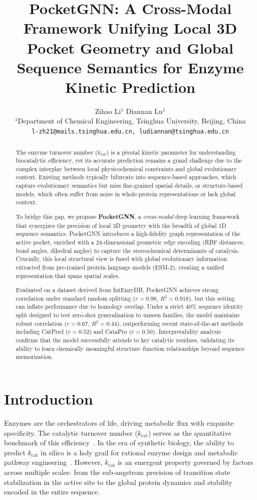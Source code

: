 \documentclass[11pt]{article}
\title{\textbf{PocketGNN: A Cross-Modal Framework Unifying Local 3D Pocket Geometry and Global Sequence Semantics for Enzyme Kinetic Prediction}}
\author{
  Zihao Li$^{1}$ \quad Diannan Lu$^{1}$\\[3pt]
  $^{1}$Department of Chemical Engineering, Tsinghua University, Beijing, China\\
  \texttt{l-zh21@mails.tsinghua.edu.cn, ludiannan@tsinghua.edu.cn}
}
\date{}
\begin{document}
\maketitle

\begin{abstract}
The enzyme turnover number ($k_{\text{cat}}$) is a pivotal kinetic parameter for understanding biocatalytic efficiency, yet its accurate prediction remains a grand challenge due to the complex interplay between local physicochemical constraints and global evolutionary context. Existing methods typically bifurcate into sequence-based approaches, which capture evolutionary semantics but miss fine-grained spatial details, or structure-based models, which often suffer from noise in whole-protein representations or lack global context.

To bridge this gap, we propose \textbf{PocketGNN}, a \emph{cross-modal} deep learning framework that synergizes the precision of local 3D geometry with the breadth of global 1D sequence semantics. PocketGNN introduces a high-fidelity graph representation of the active pocket, enriched with a 24-dimensional geometric edge encoding (RBF distances, bond angles, dihedral angles) to capture the stereochemical determinants of catalysis. Crucially, this local structural view is fused with global evolutionary information extracted from pre-trained protein language models (ESM-2), creating a unified representation that spans spatial scales.

Evaluated on a dataset derived from IntEnzyDB, PocketGNN achieves strong correlation under standard random splitting ($r=0.98$, $R^2=0.918$), but this setting can inflate performance due to homology overlap. Under a strict 40\% sequence identity split designed to test zero-shot generalization to unseen families, the model maintains robust correlation ($r=0.67$, $R^2=0.44$), outperforming recent state-of-the-art methods including CatPred ($r=0.52$) and CataPro ($r=0.50$). Interpretability analysis confirms that the model successfully attends to key catalytic residues, validating its ability to learn chemically meaningful structure--function relationships beyond sequence memorization.
\end{abstract}

\section{Introduction}
\label{sec:intro}

Enzymes are the orchestrators of life, driving metabolic flux with exquisite specificity. The catalytic turnover number ($k_{\text{cat}}$) serves as the quantitative benchmark of this efficiency~\citep{srinivasan2023guide}. In the era of synthetic biology, the ability to predict $k_{\text{cat}}$ in silico is a holy grail for rational enzyme design and metabolic pathway engineering~\citep{yan2022intenzydb, yu2023unikp}. However, $k_{\text{cat}}$ is an emergent property governed by factors across multiple scales: from the sub-angstrom precision of transition state stabilization in the active site to the global protein dynamics and stability encoded in the entire sequence.
\end{document}

